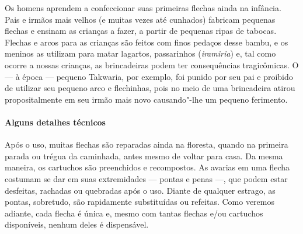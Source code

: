 Os homens aprendem a confeccionar suas primeiras flechas ainda na
infância. Pais e irmãos mais velhos (e muitas vezes até cunhados)
fabricam pequenas flechas e ensinam as crianças a fazer, a partir de
pequenas ripas de tabocas. Flechas e arcos para as crianças são feitos
com finos pedaços desse bambu, e os meninos as utilizam para matar
lagartos, passarinhos (\emph{iramiria}) e, tal como ocorre a nossas
crianças, as brincadeiras podem ter consequências tragicômicas. O --- à
época --- pequeno Takwaria, por exemplo, foi punido por seu pai e proibido
de utilizar seu pequeno arco e flechinhas, pois no meio de uma
brincadeira atirou propositalmente em seu irmão mais novo causando"-lhe
um pequeno ferimento.

\paragraph{Alguns detalhes técnicos}

Após o uso, muitas flechas são reparadas ainda na floresta, quando na
primeira parada ou trégua da caminhada, antes mesmo de voltar para casa.
Da mesma maneira, os cartuchos são preenchidos e recompostos. As avarias
em uma flecha costumam se dar em suas extremidades --- pontas e penas ---,
que podem estar desfeitas, rachadas ou quebradas após o uso. Diante de
qualquer estrago, as pontas, sobretudo, são rapidamente substituídas ou
refeitas. Como veremos adiante, cada flecha é única e, mesmo com tantas
flechas e/ou cartuchos disponíveis, nenhum deles é dispensável.

